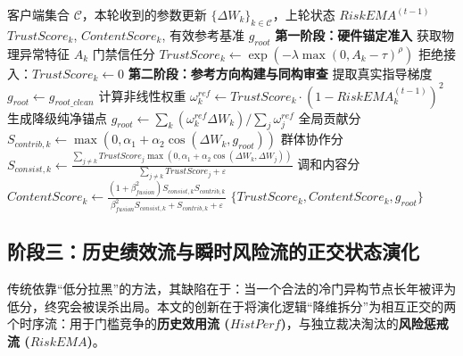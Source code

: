 \documentclass[runningheads]{llncs}
\begin{document}
\begin{algorithm}[htbp]
\caption{基于 TEE 硬件锚点与纯净参考的准入与内容审查}
\label{alg:phase12}
\begin{algorithmic}[1]
\REQUIRE 客户端集合 $\mathcal{C}$，本轮收到的参数更新 $\{\Delta W_k\}_{k\in\mathcal{C}}$，上轮状态 $RiskEMA^{(t-1)}$
\ENSURE $TrustScore_k$, $ContentScore_k$, 有效参考基准 $g_{root}$
\STATE \textbf{第一阶段：硬件锚定准入}
        \STATE 获取物理异常特征 $A_k$
        \STATE 门禁信任分 $TrustScore_k \leftarrow \exp(-\lambda \max(0, A_k-\tau)^\rho)$
    \ELSE
        \STATE 拒绝接入：$TrustScore_k \leftarrow 0$
    \ENDIF
\ENDFOR
\STATE \textbf{第二阶段：参考方向构建与同构审查}
    \STATE 提取真实指导梯度 $g_{root} \leftarrow g_{root\_clean}$
\ELSE
    \STATE 计算非线性权重 $\omega_k^{ref} \leftarrow TrustScore_k \cdot (1 - RiskEMA_k^{(t-1)})^2$
    \STATE 生成降级纯净锚点 $g_{root} \leftarrow \sum_k (\omega_k^{ref} \Delta W_k) / \sum_j \omega_j^{ref}$
\ENDIF
{}
    \STATE 全局贡献分 $S_{contrib,k} \leftarrow \max(0, \alpha_1 + \alpha_2 \cos(\Delta W_k, g_{root}))$
    \STATE 群体协作分 $S_{consist,k} \leftarrow \frac{\sum_{j \neq k} TrustScore_j \max(0, \alpha_1 + \alpha_2 \cos(\Delta W_k, \Delta W_j))}{\sum_{j \neq k} TrustScore_j + \varepsilon}$
    \STATE 调和内容分 $ContentScore_k \leftarrow \frac{(1+\beta_{fusion}^2)S_{consist,k} S_{contrib,k}}{\beta_{fusion}^2 S_{consist,k} + S_{contrib,k} + \varepsilon}$
\ENDFOR
\RETURN $\{TrustScore_k, ContentScore_k, g_{root}\}$
\end{algorithmic}
\end{algorithm}


\subsection{阶段三：历史绩效流与瞬时风险流的正交状态演化}
传统依靠“低分拉黑”的方法，其缺陷在于：当一个合法的冷门异构节点长年被评为低分，终究会被误杀出局。本文的创新在于将演化逻辑“降维拆分”为相互正交的两个时序流：用于门槛竞争的\textbf{历史效用流 ($HistPerf$)}，与独立裁决淘汰的\textbf{风险惩戒流 ($RiskEMA$)}。
\end{document}
